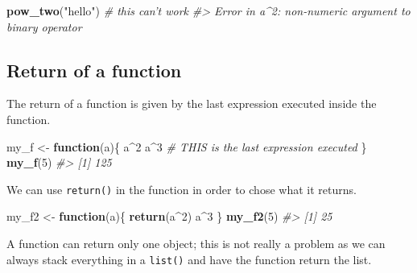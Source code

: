 \documentclass[]{book}
\newenvironment{Shaded}{}{}
\newcommand{\CommentTok}[1]{\textcolor[rgb]{0.38,0.63,0.69}{\textit{#1}}}
\newcommand{\ControlFlowTok}[1]{\textcolor[rgb]{0.00,0.44,0.13}{\textbf{#1}}}
\newcommand{\DecValTok}[1]{\textcolor[rgb]{0.25,0.63,0.44}{#1}}
\newcommand{\KeywordTok}[1]{\textcolor[rgb]{0.00,0.44,0.13}{\textbf{#1}}}
\newcommand{\NormalTok}[1]{#1}
\newcommand{\OperatorTok}[1]{\textcolor[rgb]{0.40,0.40,0.40}{#1}}
\newcommand{\StringTok}[1]{\textcolor[rgb]{0.25,0.44,0.63}{#1}}
\theoremstyle{definition}
\theoremstyle{definition}
\theoremstyle{definition}
\theoremstyle{remark}
\begin{document}
\begin{Shaded}
\begin{Highlighting}[]
\KeywordTok{pow_two}\NormalTok{(}\StringTok{"hello"}\NormalTok{) }\CommentTok{# this can't work}
\CommentTok{#> Error in a^2: non-numeric argument to binary operator}
\end{Highlighting}
\end{Shaded}

\hypertarget{return-of-a-function}{%
\subsection{Return of a function}\label{return-of-a-function}}

The return of a function is given by the last expression executed inside
the function.

\begin{Shaded}
\begin{Highlighting}[]
\NormalTok{my_f <-}\StringTok{ }\ControlFlowTok{function}\NormalTok{(a)\{}
\NormalTok{  a}\OperatorTok{^}\DecValTok{2}
\NormalTok{  a}\OperatorTok{^}\DecValTok{3} \CommentTok{# THIS is the last expression executed}
\NormalTok{\}}
\KeywordTok{my_f}\NormalTok{(}\DecValTok{5}\NormalTok{)}
\CommentTok{#> [1] 125}
\end{Highlighting}
\end{Shaded}

We can use \texttt{return()} in the function in order to chose what it
returns.

\begin{Shaded}
\begin{Highlighting}[]
\NormalTok{my_f2 <-}\StringTok{ }\ControlFlowTok{function}\NormalTok{(a)\{}
  \KeywordTok{return}\NormalTok{(a}\OperatorTok{^}\DecValTok{2}\NormalTok{)}
\NormalTok{  a}\OperatorTok{^}\DecValTok{3}
\NormalTok{\}}
\KeywordTok{my_f2}\NormalTok{(}\DecValTok{5}\NormalTok{)}
\CommentTok{#> [1] 25}
\end{Highlighting}
\end{Shaded}

A function can return only one object; this is not really a problem as
we can always stack everything in a \texttt{list()} and have the
function return the list.
\end{document}
